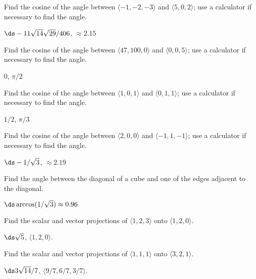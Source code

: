 \begin{theorem}
\begin{exercises}
\begin{exercise} Find the cosine of the angle between $\langle -1, -2,-3\rangle$
and $\langle 5,0,2\rangle$; use a calculator if necessary to find the angle.
\begin{answer} $\ds -11\sqrt{14}\sqrt{29}/406$, $\approx 2.15$
\end{answer}\end{exercise}

\begin{exercise} Find the cosine of the angle between $\langle 47,100,0\rangle$
and $\langle 0,0,5\rangle$; use a calculator if necessary to find the angle.
\begin{answer} $0$, $\pi/2$
\end{answer}\end{exercise}

\begin{exercise} Find the cosine of the angle between $\langle 1,0,1 \rangle$
and $\langle 0,1,1\rangle$; use a calculator if necessary to find the angle.
\begin{answer} $1/2$, $\pi/3$
\end{answer}\end{exercise}

\begin{exercise} Find the cosine of the angle between $\langle 2,0,0\rangle$
and $\langle -1,1,-1\rangle$; use a calculator if necessary to find the angle.
\begin{answer} $\ds -1/\sqrt3$, $\approx 2.19$
\end{answer}\end{exercise}

\begin{exercise} Find the angle between the diagonal of a cube and one of the
edges adjacent to the diagonal.
\begin{answer} $\ds \arccos(1/\sqrt3)\approx 0.96$
\end{answer}\end{exercise}

\begin{exercise} Find the scalar and vector projections of $\langle 1,2,3\rangle$
onto $\langle 1,2,0\rangle$.
\begin{answer} $\ds \sqrt{5}$, $\langle 1,2,0\rangle$.
\end{answer}\end{exercise}

\begin{exercise} Find the scalar and vector projections of $\langle 1,1,1\rangle$
onto $\langle 3,2,1\rangle$.
\begin{answer} $\ds 3\sqrt{14}/7$, $\langle 9/7,6/7,3/7\rangle$.
\end{answer}\end{exercise}


\end{exercises}
\end{theorem}
